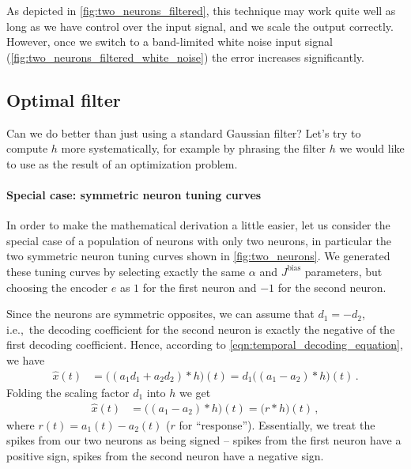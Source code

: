 \documentclass[10pt,letterpaper,oneside]{article}
\begin{document}
As depicted in \cref{fig:two_neurons_filtered}, this technique may work quite well as long as we have control over the input signal, and we scale the output correctly. However, once we switch to a band-limited white noise input signal (\cref{fig:two_neurons_filtered_white_noise}) the error increases significantly.


\subsection{Optimal filter}

Can we do better than just using a standard Gaussian filter? Let's try to compute $h$ more systematically, for example by phrasing the filter $h$ we would like to use as the result of an optimization problem.

\paragraph{Special case: symmetric neuron tuning curves}
In order to make the mathematical derivation a little easier, let us consider the special case of a population of neurons with only two neurons, in particular the two symmetric neuron tuning curves shown in \cref{fig:two_neurons}. We generated these tuning curves by selecting exactly the same $\alpha$ and $J^\mathrm{bias}$ parameters, but choosing the encoder $e$ as $1$ for the first neuron and $-1$ for the second neuron.

Since the neurons are symmetric opposites, we can assume that $d_1 = -d_2$, i.e.,~the decoding coefficient for the second neuron is exactly the negative of the first decoding coefficient. Hence, according to \cref{eqn:temporal_decoding_equation}, we have
\begin{align*}
	\hat x(t)
		&= \big((a_1 d_1 + a_2 d_2) \ast h \big)(t) =  d_1 \big((a_1 - a_2) \ast h \big)(t) \,.
\end{align*}
Folding the scaling factor $d_1$ into $h$ we get
\begin{align*}
	\hat x(t) &= \big((a_1 - a_2) \ast h \big)(t) = \big(r \ast h \big)(t) \,,
\end{align*}
where $r(t) = a_1(t) - a_2(t)$ ($r$ for \enquote{response}). Essentially, we treat the spikes from our two neurons as being signed -- spikes from the first neuron have a positive sign, spikes from the second neuron have a negative sign.

\end{document}
